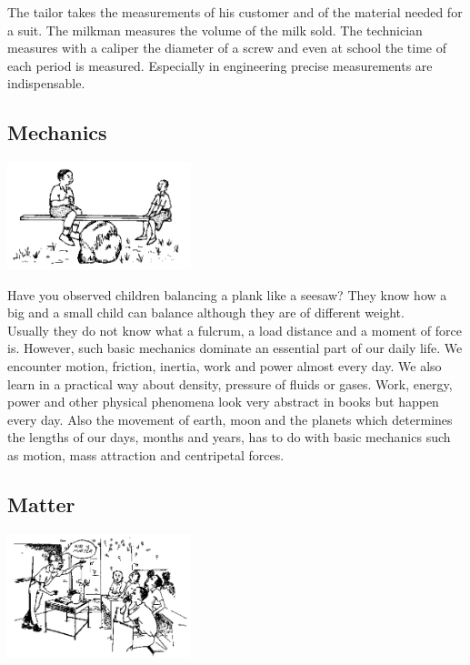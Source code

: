 \begin{multicols}{2}
The tailor takes the measurements of his customer and of the material needed for a suit. The
milkman measures the volume of the milk sold. The technician measures with a caliper the
diameter of a screw and even at school the time of each period is measured. Especially in
engineering precise measurements are indispensable.

\vfill
\columnbreak

\subsection{Mechanics} 

\begin{center}
\includegraphics[width=0.4\textwidth]{./img/source/mechanics.png}
\end{center}

Have you observed children balancing a plank like a seesaw? They know how a big and a
small child can balance although they are of different weight.\\

Usually they do not know what a fulcrum, a load distance and a moment of force is. However,
such basic mechanics dominate an essential part of our daily life. We encounter motion,
friction, inertia, work and power almost every day. We also learn in a practical way about
density, pressure of fluids or gases. Work, energy, power and other physical phenomena look
very abstract in books but happen every day. Also the movement of earth, moon and the
planets which determines the lengths of our days, months and years, has to do with basic
mechanics such as motion, mass attraction and centripetal forces.

\subsection{Matter} 

\begin{center}
\includegraphics[width=0.4\textwidth]{./img/source/matter.png}
\end{center}


\end{multicols}
